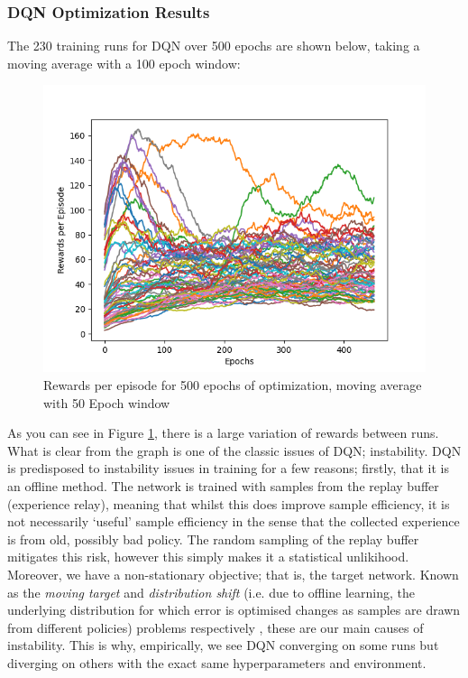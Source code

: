 \documentclass[12pt]{article}
\begin{document}
\subsubsection{DQN Optimization Results} \label{dqnopt}
The 230 training runs for DQN over 500 epochs are shown below, taking a moving average with a 100 epoch window: 
\begin{figure}[H]
    \centering
    \includegraphics[scale=0.7]{9.png}
    \caption{Rewards per episode for 500 epochs of optimization, moving average with 50 Epoch window}
    \label{dqn_all_runs}
\end{figure}
As you can see in Figure \ref{dqn_all_runs}, there is a large variation of rewards between runs. What is clear from the graph is one of the classic issues of DQN; instability. DQN is predisposed to instability issues in training for a few reasons; firstly, that it is an offline method. The network is trained with samples from the replay buffer (experience relay), meaning that whilst this does improve sample efficiency, it is not necessarily `useful' sample efficiency in the sense that the collected experience is from old, possibly bad policy. The random sampling of the replay buffer mitigates this risk, however this simply makes it a statistical unlikihood. Moreover, we have a non-stationary objective; that is, the target network. Known as the \textit{moving target} and \textit{distribution shift} (i.e. due to offline learning, the underlying distribution for which error is optimised changes as samples are drawn from different policies) problems respectively \autocite{pmlr-v97-fu19a}, these are our main causes of instability. This is why, empirically, we see DQN converging on some runs but diverging on others with the exact same hyperparameters and environment.
\end{document}
